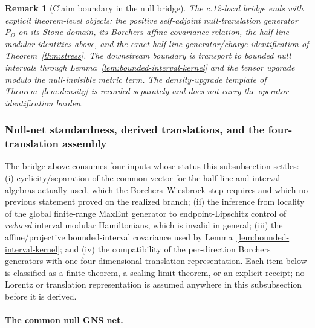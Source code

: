 \documentclass[11pt]{article}
\newtheorem{remark}[theorem]{Remark}
\begin{document}
\begin{remark}[Claim boundary in the null bridge]
The c.12-local bridge ends with explicit theorem-level objects: the positive self-adjoint null-translation generator \(P_\Omega\) on its Stone domain, its Borchers affine covariance relation, the half-line modular identities above, and the exact half-line generator/charge identification of Theorem~\ref{thm:stress}. The downstream boundary is transport to bounded null intervals through Lemma~\ref{lem:bounded-interval-kernel} and the tensor upgrade modulo the null-invisible metric term. The density-upgrade template of Theorem~\ref{lem:density} is recorded separately and does not carry the operator-identification burden.
\end{remark}
\subsubsection{Null-net standardness, derived translations, and the four-translation assembly}
\label{subsec:null-net-standardness}

The bridge above consumes four inputs whose status this subsubsection
settles: (i) cyclicity/separation of the common vector for the
half-line and interval algebras actually used, which the Borchers--Wiesbrock
step requires and which no previous statement proved on the realized branch;
(ii) the inference from locality of the global finite-range MaxEnt generator
to endpoint-Lipschitz control of \emph{reduced} interval modular Hamiltonians,
which is invalid in general; (iii) the affine/projective bounded-interval
covariance used by Lemma~\ref{lem:bounded-interval-kernel}; and (iv) the
compatibility of the per-direction Borchers generators with one four-dimensional
translation representation. Each item below is classified as a finite theorem,
a scaling-limit theorem, or an explicit receipt; no Lorentz or translation
representation is assumed anywhere in this subsubsection before it is derived.

\paragraph{The common null GNS net.}
\end{document}

